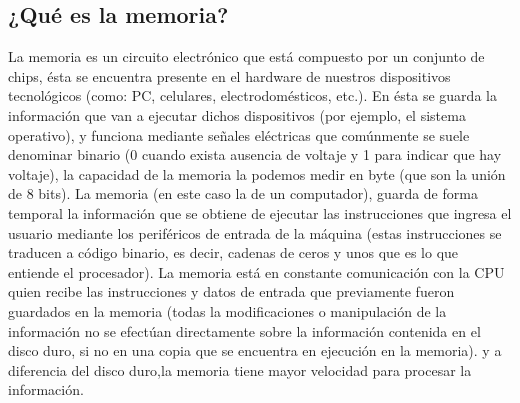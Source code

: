 \documentclass{article}
\begin{document}
\subsection{¿Qué es la memoria?} \label{contenido}
La memoria es un circuito electrónico que está compuesto por un conjunto de chips, ésta se encuentra presente en el hardware de nuestros dispositivos tecnológicos (como: PC, celulares, electrodomésticos, etc.). En ésta se guarda la información que van a ejecutar dichos dispositivos (por ejemplo, el sistema operativo), y funciona mediante señales eléctricas que comúnmente se suele denominar binario (0 cuando exista ausencia de voltaje y 1 para indicar que hay voltaje), la capacidad de la memoria la podemos medir en byte (que son la unión de 8 bits). La memoria (en este caso la de un computador), guarda de forma temporal la información que se obtiene de ejecutar las instrucciones que ingresa el usuario mediante los periféricos de entrada de la máquina (estas instrucciones se traducen a código binario, es decir, cadenas de ceros y unos que es lo que entiende el procesador). La memoria está en constante comunicación con la CPU quien recibe las instrucciones y datos de entrada que previamente fueron guardados en la memoria (todas la modificaciones o manipulación de la información no se efectúan directamente sobre la información contenida en el disco duro, si no en una copia que se encuentra en ejecución en la memoria). y a diferencia del disco duro,la memoria tiene mayor velocidad para procesar la información. 
\end{document}
